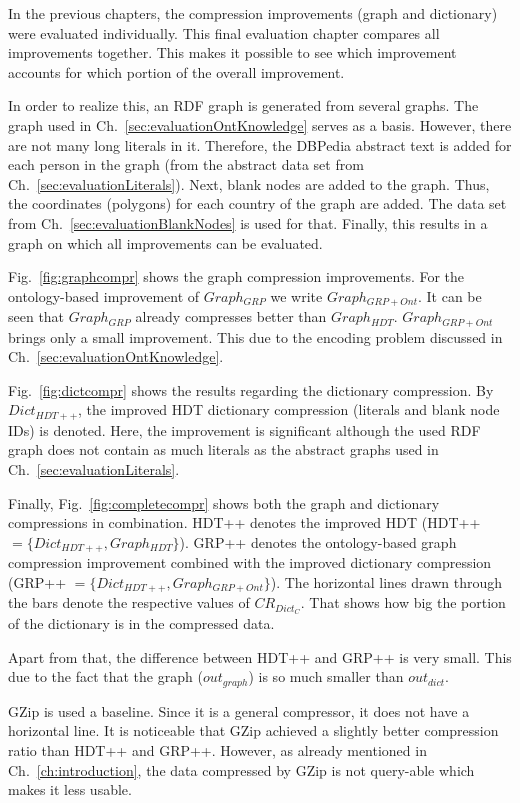 In the previous chapters, the compression improvements (graph and dictionary) were evaluated individually. This final evaluation chapter compares all improvements together. This makes it possible to see which improvement accounts for which portion of the overall improvement. 

In order to realize this, an RDF graph is generated from several graphs. The graph used in Ch.~\ref{sec:evaluationOntKnowledge} serves as a basis. However, there are not many long literals in it. Therefore, the DBPedia abstract text is added for each person in the graph (from the abstract data set from Ch.~\ref{sec:evaluationLiterals}). Next, blank nodes are added to the graph. Thus, the coordinates (polygons) for each country of the graph are added. The data set from Ch.~\ref{sec:evaluationBlankNodes} is used for that. Finally, this results in a graph on which all improvements can be evaluated.

Fig.~\ref{fig:graphcompr} shows the graph compression improvements. For the ontology-based improvement of $Graph_{GRP}$ we write $Graph_{GRP+Ont}$.  It can be seen that $Graph_{GRP}$ already compresses better than $Graph_{HDT}$. $Graph_{GRP+Ont}$ brings only a small improvement. This due to the encoding problem discussed in Ch.~\ref{sec:evaluationOntKnowledge}.

Fig.~\ref{fig:dictcompr} shows the results regarding the dictionary compression. By $Dict_{HDT++}$, the improved HDT dictionary compression (literals and blank node IDs) is denoted. Here, the improvement is significant although the used RDF graph does not contain as much literals as the abstract graphs used in Ch.~\ref{sec:evaluationLiterals}. 

Finally, Fig.~\ref{fig:completecompr} shows both the graph and dictionary compressions in combination. HDT++ denotes the improved HDT (HDT++$=\{  Dict_{HDT++}, Graph_{HDT} \} $). GRP++ denotes the ontology-based graph compression improvement combined with the improved dictionary compression (GRP++ $=\{ Dict_{HDT++}, Graph_{GRP+Ont} \}$). The horizontal lines drawn through the bars denote the respective values of $CR_{Dict_C}$. That shows how big the portion of the dictionary is in the compressed data. 

Apart from that, the difference between HDT++ and GRP++ is very small. This due to the fact that the graph ($out_{graph}$) is so much smaller than $out_{dict}$.

GZip is used a baseline. Since it is a general compressor, it does not have a horizontal line. It is noticeable that GZip achieved a slightly better compression ratio than HDT++ and GRP++. However, as already mentioned in Ch.~\ref{ch:introduction}, the data compressed by GZip is not query-able which makes it less usable.

